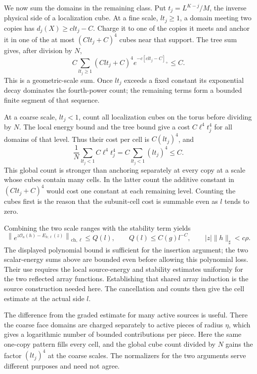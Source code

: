 \documentclass[11pt,letterpaper,reqno]{amsart}
\theoremstyle{definition}
\theoremstyle{remark}
\newcommand{\cO}{\mathcal O}
\begin{document}
We now sum the domains in the remaining class. Put
$t_j=L^{K-j}/M$, the inverse physical side of a localization cube.
At a fine scale, $lt_j\ge1$, a domain meeting two copies has
$d_j(X)\ge clt_j-C$. Charge it to one of the copies it meets
and anchor it in one of the at most $(Clt_j+C)^4$ cubes near
that support. The tree sum gives, after division by $N$,
\[
 C\sum_{lt_j\ge1}(Clt_j+C)^4e^{-c[clt_j-C]_+}\le C.
\]
This is a geometric-scale sum. Once $lt_j$ exceeds a fixed
constant its exponential decay dominates the fourth-power count;
the remaining terms form a bounded finite segment of that sequence.

At a coarse scale, $lt_j<1$, count all localization cubes on the
torus before dividing by $N$. The local energy bound and the tree
bound give a cost $C\ell^4t_j^4$ for all domains of that level.
Thus their cost per cell is $C(lt_j)^4$, and
\[
 \frac1N\sum_{lt_j<1}C\ell^4t_j^4
                 =C\sum_{lt_j<1}(lt_j)^4\le C.
\]
This global count is stronger than anchoring separately at every
copy at a scale whose cubes contain many cells. In the latter
count the additive constant in $(Clt_j+C)^4$ would cost one
constant at each remaining level. Counting the cubes first is the
reason that the subunit-cell cost is summable even as $l$ tends
to zero.

Combining the two scale ranges with the stability term yields
\begin{equation}\label{eq:rotation-cell-stability}
 \left\|e^{z\cO_a(h)-E_{h;\ell}(z)}\right\|_{\mathrm{ch},\ell}
       \le Q(l),\qquad Q(l)\le C(g)l^{-C},
 \qquad |z|\|h\|_\sharp<c\rho.
\end{equation}
The displayed polynomial bound is sufficient for the insertion
argument; the two scalar-energy sums above are bounded even before
allowing this polynomial loss. Their use requires the local
source-energy and stability estimates uniformly for the two reflected
array functions. Establishing that shared array induction is the
source construction needed here. The cancellation and counts then
give the cell estimate at the actual side $l$.

The difference from the graded estimate for many active sources is
useful. There the coarse face domains are charged separately to
active pieces of radius $\eta$, which gives a logarithmic number
of bounded contributions per piece. Here the same one-copy pattern
fills every cell, and the global cube count divided by $N$ gains
the factor $(lt_j)^4$ at the coarse scales. The normalizers for
the two arguments serve different purposes and need not agree.
\end{document}
